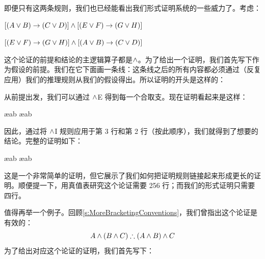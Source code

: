 即便只有这两条规则，我们也已经能看出我们形式证明系统的一些威力了。考虑：


\begin{earg}
\item[] $[(A\vee B)\rightarrow(C\vee D)] \wedge [(E \vee F) \rightarrow (G\vee H)]$
\item[\texttherefore] $[(E \vee F) \rightarrow (G\vee H)] \wedge [(A\vee B)\rightarrow(C\vee D)]$
\end{earg}


这个论证的前提和结论的主逻辑算子都是$\wedge$。为了给出一个证明，我们首先写下作为假设的前提。我们在它下面画一条线：这条线之后的所有内容都必须通过（反复应用）我们的推理规则从我们的假设得出。所以证明的开头是这样的：


\begin{fitchproof}
	\PR
\end{fitchproof}


从前提出发，我们可以通过 $\wedge$E 得到每一个合取支。现在证明看起来是这样：


\begin{fitchproof}
	\PR
	 \ae{ab}
	 \ae{ab}
\end{fitchproof}


因此，通过将 $\wedge$I 规则应用于第 3 行和第 2 行（按此顺序），我们就得到了想要的结论。完整的证明如下：


\begin{fitchproof}
	\PR

	 \ae{ab}
	 \ae{ab}
	 
\end{fitchproof}


这是一个非常简单的证明，但它展示了我们如何把证明规则链接起来形成更长的证明。顺便提一下，用真值表研究这个论证需要 256 行；而我们的形式证明只需要四行。

值得再举一个例子。回顾\cref{s:MoreBracketingConventions}，我们曾指出这个论证是有效的：
	$$A \eand (B \eand C) \therefore (A \eand B) \eand C$$
为了给出对应这个论证的证明，我们首先写下：


\begin{fitchproof}
	\PR
\end{fitchproof}


